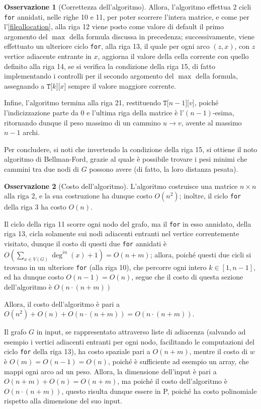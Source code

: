 \documentclass[14pt]{extreport}
\theoremstyle{definition}
\theoremstyle{definition}
\newtheorem{remark}{Osservazione}[subsection]
\begin{document}
\begin{remark}[Correttezza dell'algoritmo]
    Allora, l'algoritmo effettua 2 cicli \texttt{for} annidati, nelle righe 10 e 11, per poter scorrere l'intera matrice, e come per l'\cref{fileallocation}, alla riga 12 viene posto come valore di default il primo argomento del $\max$ della formula discussa in precedenza; successivamente, viene effettuato un ulteriore ciclo \texttt{for}, alla riga 13, il quale per ogni arco $(z, x)$, con $z$ vertice adiacente entrante in $x$, aggiorna il valore della cella corrente con quello definito alla riga 14, se si verifica la condizione della riga 15, di fatto implementando i controlli per il secondo argomento del $\max$ della formula, assegnando a $\texttt{T[}k\texttt{][}x\texttt{]}$ sempre il valore maggiore corrente.

    Infine, l'algoritmo termina alla riga 21, restituendo $\texttt{T[}n - 1\texttt{][}v\texttt{]}$, poiché l'indicizzazione parte da $0$ e l'ultima riga della matrice è l'$(n - 1)$-esima, ritornando dunque il peso massimo di un cammino $u \rightarrow v$, avente al massimo $n - 1$ archi.

    Per concludere, si noti che invertendo la condizione della riga 15, si ottiene il noto algoritmo di Bellman-Ford, grazie al quale è possibile trovare i pesi minimi che cammini tra due nodi di $G$ possono avere (di fatto, la loro distanza pesata).
\end{remark}

\begin{remark}[Costo dell'algoritmo]
    L'algoritmo costruisce una matrice $n \times n$ alla riga 2, e la sua costruzione ha dunque costo $O(n^2)$; inoltre, il ciclo \texttt{for} della riga 3 ha costo $O(n)$.

    Il ciclo della riga 11 scorre ogni nodo del grafo, ma il \texttt{for} in esso annidato, della riga 13, cicla solamente sui nodi adiacenti entranti nel vertice correntemente visitato, dunque il costo di questi due \texttt{for} annidati è $\displaystyle O\left(\sum_{x \in V(G)}{\deg^{in}(x) + 1} \right) = O(n + m)$; allora, poiché questi due cicli si trovano in un ulteriore \texttt{for} (alla riga 10), che percorre ogni intero $k \in [1, n- 1]$, ed ha dunque costo $O(n - 1) = O(n)$, segue che il costo di questa sezione dell'algoritmo è $O(n \cdot (n + m))$

    Allora, il costo dell'algoritmo è pari a $O(n ^2) + O(n) + O(n \cdot(n + m)) = O(n \cdot (n + m))$.

    Il grafo $G$ in input, se rappresentato attraverso liste di adiacenza (salvando ad esempio i vertici adiacenti entranti per ogni nodo, facilitando le computazioni del ciclo \texttt{for} della riga 13), ha costo spaziale pari a $O(n + m)$, mentre il costo di $w$ è $O(m) = O(n - 1) = O(n)$, poiché è sufficiente ad esempio un array, che mappi ogni arco ad un peso. Allora, la dimensione dell'input è pari a $O(n + m) + O(n) = O(n + m)$, ma poiché il costo dell'algoritmo è $O(n \cdot (n + m))$, questo risulta dunque essere in P, poiché ha costo polinomiale rispetto alla dimensione del suo input.
\end{remark}
\end{document}
